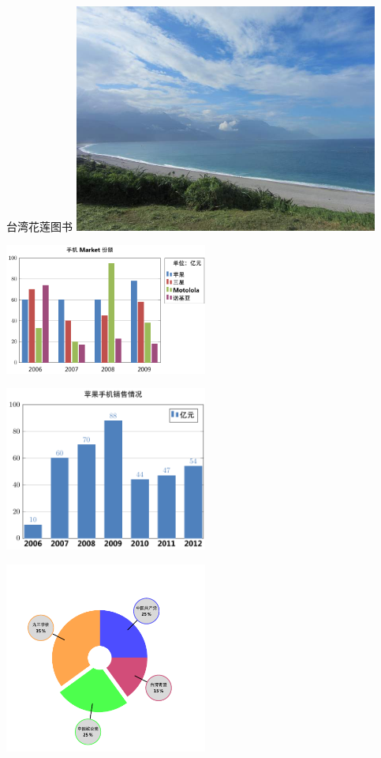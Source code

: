 \begin{Figure}{台湾花莲图书}
    \includegraphics[width=0.75\textwidth]{./contents/test.jpg}
\end{Figure}

\begin{Figure}{}
    \includegraphics[width=0.5\textwidth]{./contents/test.pdf}
\end{Figure}

\begin{Figure}{}
    \includegraphics[width=0.5\textwidth]{./contents/test2.pdf}
\end{Figure}

\begin{Figure}{}
    \includegraphics[width=0.5\textwidth]{./contents/test3.pdf}
\end{Figure}

